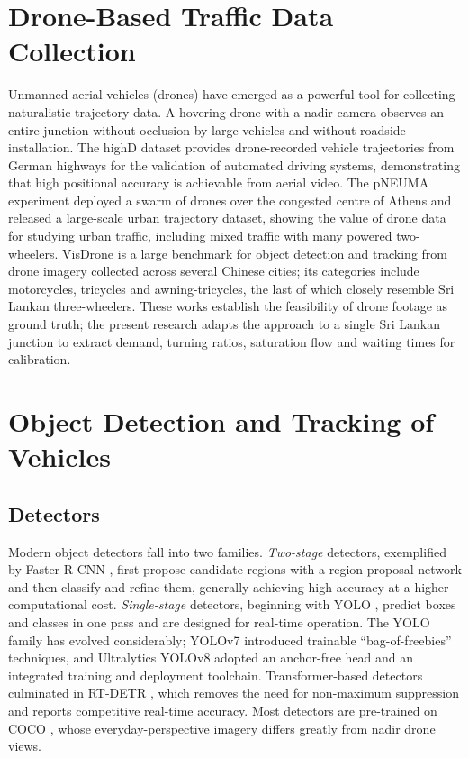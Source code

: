 \section{Drone-Based Traffic Data Collection}\label{sec:lit-drone}
Unmanned aerial vehicles (drones) have emerged as a powerful tool for collecting naturalistic trajectory data.
A hovering drone with a nadir camera observes an entire junction without occlusion by large vehicles and without
roadside installation. The highD dataset \cite{krajewski2018highd} provides drone-recorded vehicle trajectories
from German highways for the validation of automated driving systems, demonstrating that high positional
accuracy is achievable from aerial video. The pNEUMA experiment \cite{barmpounakis2020pneuma} deployed a swarm of
drones over the congested centre of Athens and released a large-scale urban trajectory dataset, showing the
value of drone data for studying urban traffic, including mixed traffic with many powered two-wheelers.
VisDrone \cite{zhu2022visdrone} is a large benchmark for object detection and tracking from drone imagery
collected across several Chinese cities; its categories include motorcycles, tricycles and awning-tricycles,
the last of which closely resemble Sri Lankan three-wheelers. These works establish the feasibility of drone
footage as ground truth; the present research adapts the approach to a single Sri Lankan junction to extract
demand, turning ratios, saturation flow and waiting times for calibration.

\section{Object Detection and Tracking of Vehicles}\label{sec:lit-cv}
\subsection{Detectors}
Modern object detectors fall into two families. \emph{Two-stage} detectors, exemplified by Faster R-CNN
\cite{ren2015faster}, first propose candidate regions with a region proposal network and then classify and refine
them, generally achieving high accuracy at a higher computational cost. \emph{Single-stage} detectors, beginning
with YOLO \cite{redmon2016yolo}, predict boxes and classes in one pass and are designed for real-time operation.
The YOLO family has evolved considerably; YOLOv7 \cite{wang2023yolov7} introduced trainable ``bag-of-freebies''
techniques, and Ultralytics YOLOv8 \cite{jocher2023yolov8} adopted an anchor-free head and an integrated training
and deployment toolchain. Transformer-based detectors culminated in RT-DETR \cite{zhao2024rtdetr}, which removes
the need for non-maximum suppression and reports competitive real-time accuracy. Most detectors are pre-trained on
COCO \cite{lin2014coco}, whose everyday-perspective imagery differs greatly from nadir drone views.


